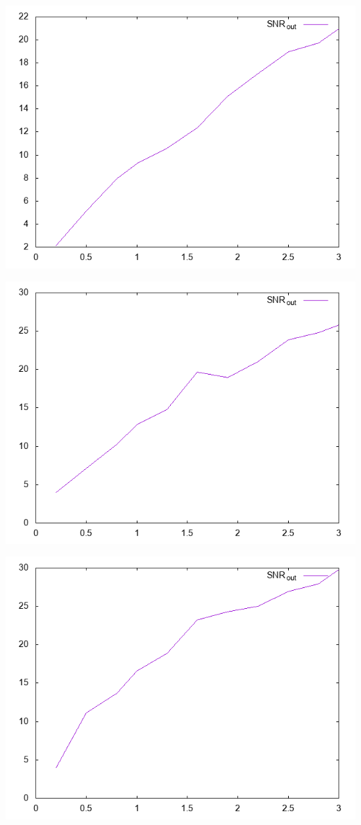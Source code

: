 \vspace*{100bp}


\includegraphics[scale=0.7,natwidth=320bp,natheight=240bp]{img/output_r22m10.csv.png}

\includegraphics[scale=0.7,natwidth=320bp,natheight=240bp]{img/output_r22m25.csv.png}

\includegraphics[scale=0.7,natwidth=320bp,natheight=240bp]{img/output_r22m50.csv.png}


